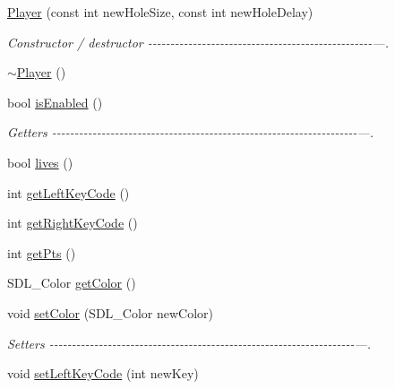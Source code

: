 \begin{DoxyCompactItemize}
\item 
\hyperlink{classPlayer_a172ac5521a20dbb9490862fa5f3dd6e6}{Player} (const int new\+Hole\+Size, const int new\+Hole\+Delay)
\begin{DoxyCompactList}\small\item\em Constructor / destructor -\/-\/-\/-\/-\/-\/-\/-\/-\/-\/-\/-\/-\/-\/-\/-\/-\/-\/-\/-\/-\/-\/-\/-\/-\/-\/-\/-\/-\/-\/-\/-\/-\/-\/-\/-\/-\/-\/-\/-\/-\/-\/-\/-\/-\/-\/-\/-\/-\/-\/---. \end{DoxyCompactList}\item 
\hyperlink{classPlayer_a749d2c00e1fe0f5c2746f7505a58c062}{$\sim$\+Player} ()
\item 
bool \hyperlink{classPlayer_a218ef195d9329e6c636f9720c7eb3b58}{is\+Enabled} ()
\begin{DoxyCompactList}\small\item\em Getters -\/-\/-\/-\/-\/-\/-\/-\/-\/-\/-\/-\/-\/-\/-\/-\/-\/-\/-\/-\/-\/-\/-\/-\/-\/-\/-\/-\/-\/-\/-\/-\/-\/-\/-\/-\/-\/-\/-\/-\/-\/-\/-\/-\/-\/-\/-\/-\/-\/-\/-\/-\/-\/-\/-\/-\/-\/-\/-\/-\/-\/-\/-\/-\/-\/-\/-\/-\/---. \end{DoxyCompactList}\item 
bool \hyperlink{classPlayer_a51db475c4d81863182ed51e109436ec7}{lives} ()
\item 
int \hyperlink{classPlayer_aceea3d77b07b2b45c870d7cf1063a951}{get\+Left\+Key\+Code} ()
\item 
int \hyperlink{classPlayer_a0978fd16776a588c59dd84fec4d47716}{get\+Right\+Key\+Code} ()
\item 
int \hyperlink{classPlayer_a319f5f1cdf07ed8649a336fa347ec142}{get\+Pts} ()
\item 
S\+D\+L\+\_\+\+Color \hyperlink{classPlayer_ae5c057b159929ee6210c21bb296ecc93}{get\+Color} ()
\item 
void \hyperlink{classPlayer_ab6c7e79f5678f7b1e0633cea8f1b373f}{set\+Color} (S\+D\+L\+\_\+\+Color new\+Color)
\begin{DoxyCompactList}\small\item\em Setters -\/-\/-\/-\/-\/-\/-\/-\/-\/-\/-\/-\/-\/-\/-\/-\/-\/-\/-\/-\/-\/-\/-\/-\/-\/-\/-\/-\/-\/-\/-\/-\/-\/-\/-\/-\/-\/-\/-\/-\/-\/-\/-\/-\/-\/-\/-\/-\/-\/-\/-\/-\/-\/-\/-\/-\/-\/-\/-\/-\/-\/-\/-\/-\/-\/-\/-\/-\/---. \end{DoxyCompactList}\item 
void \hyperlink{classPlayer_a212dbceed395a15bcce9d6028321d39c}{set\+Left\+Key\+Code} (int new\+Key)
\item 

\end{DoxyCompactItemize}
